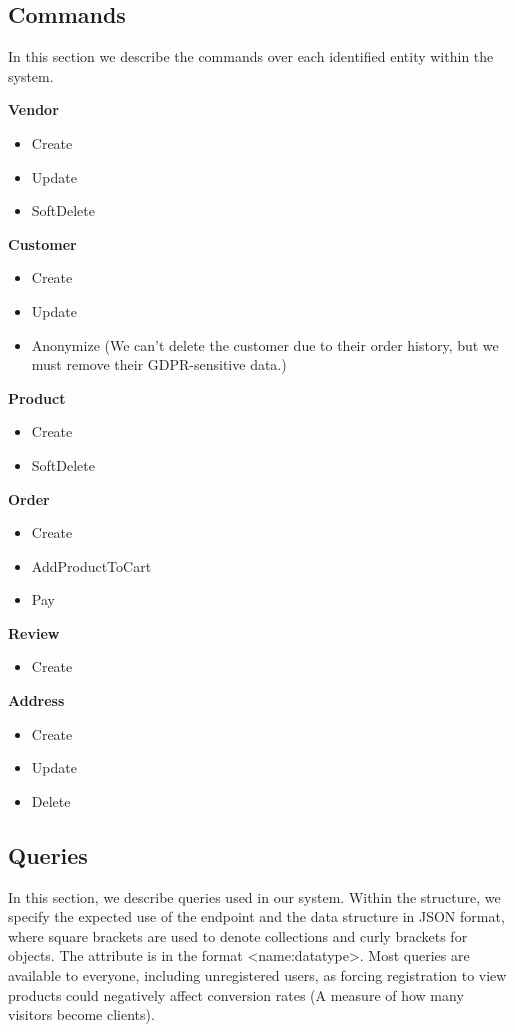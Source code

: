 \documentclass[12pt,english]{article}
\begin{document}
\newpage
\subsection{Commands}
In this section we describe the commands over each identified entity within the system.

\begin{multicols}{2}

\noindent \textbf{Vendor}
\begin{itemize}
    \item Create
    \item Update
    \item SoftDelete
\end{itemize}
\textbf{Customer}
\begin{itemize}
    \item Create
    \item Update
    \item Anonymize (We can't delete the customer due to their order history, but we must remove their GDPR-sensitive data.)
\end{itemize}
\columnbreak
\textbf{Product}
\begin{itemize}
    \item Create
    \item SoftDelete
\end{itemize}
\textbf{Order}
\begin{itemize}
    \item Create
    \item AddProductToCart
    \item Pay
\end{itemize}
\textbf{Review}
\begin{itemize}
    \item Create
\end{itemize}
\textbf{Address}
\begin{itemize}
    \item Create
    \item Update
    \item Delete
\end{itemize}

\end{multicols}


\subsection{Queries}

In this section, we describe queries used in our system. Within the structure, we specify the expected use of the endpoint and the data structure in JSON format, where square brackets are used to denote collections and curly brackets for objects. The attribute is in the format <name:datatype>. Most queries are available to everyone, including unregistered users, as forcing registration to view products could negatively affect conversion rates (A measure of how many visitors become clients). \\
\end{document}
